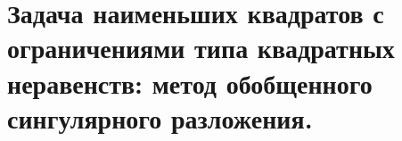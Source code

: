 \section{Задача наименьших квадратов с ограничениями типа квадратных неравенств: метод обобщенного сингулярного разложения.}
